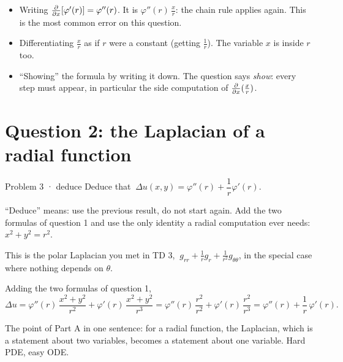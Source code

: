 \begin{trap}
\begin{itemize}
  \item Writing $\frac{\partial }{\partial x}[\varphi'(r)]=\varphi''(r)$. It is $\varphi''(r)\,\frac xr$: the chain rule applies
        again. This is the most common error on this question.
  \item Differentiating $\frac xr$ as if $r$ were a constant (getting $\frac1r$). The variable $x$ is
        inside $r$ too.
  \item ``Showing'' the formula by writing it down. The question says \emph{show}: every step must
        appear, in particular the side computation of $\frac{\partial }{\partial x}(\frac xr)$.
\end{itemize}
\end{trap}

\section{Question 2: the Laplacian of a radial function}

\begin{question}{Problem 3 \;·\; deduce}
Deduce that $\ \Delta u(x,y)=\varphi''(r)+\dfrac1r\varphi'(r)$.
\end{question}

\begin{lesson}
``Deduce'' means: use the previous result, do not start again. Add the two formulas of question 1
and use the only identity a radial computation ever needs: $x^2+y^2=r^2$.

This is the polar Laplacian you met in TD 3, $\ g_{rr}+\frac1rg_r+\frac1{r^2}g_{\theta\theta}$,
in the special case where nothing depends on $\theta$.
\end{lesson}

\begin{answer}
Adding the two formulas of question 1,
\[
  \Delta u=\varphi''(r)\,\frac{x^2+y^2}{r^2}+\varphi'(r)\,\frac{x^2+y^2}{r^3}
  =\varphi''(r)\,\frac{r^2}{r^2}+\varphi'(r)\,\frac{r^2}{r^3}=\varphi''(r)+\frac1r\,\varphi'(r).
\]
\end{answer}

\begin{intuition}
The point of Part A in one sentence: for a radial function, the Laplacian, which is a statement about
two variables, becomes a statement about one variable. Hard PDE, easy ODE.
\end{intuition}


